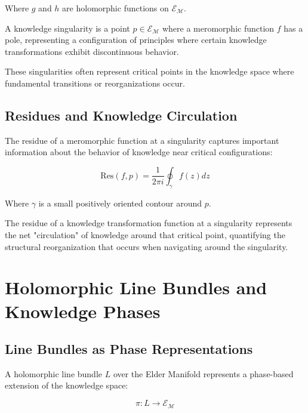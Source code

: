 Where $g$ and $h$ are holomorphic functions on $\mathcal{E}_{\mathcal{M}}$.

\begin{definition}
A knowledge singularity is a point $p \in \mathcal{E}_{\mathcal{M}}$ where a meromorphic function $f$ has a pole, representing a configuration of principles where certain knowledge transformations exhibit discontinuous behavior.
\end{definition}

These singularities often represent critical points in the knowledge space where fundamental transitions or reorganizations occur.

\subsection{Residues and Knowledge Circulation}

The residue of a meromorphic function at a singularity captures important information about the behavior of knowledge near critical configurations:

\begin{equation}
\text{Res}(f, p) = \frac{1}{2\pi i}\oint_{\gamma} f(z) dz
\end{equation}

Where $\gamma$ is a small positively oriented contour around $p$.

\begin{theorem}
The residue of a knowledge transformation function at a singularity represents the net "circulation" of knowledge around that critical point, quantifying the structural reorganization that occurs when navigating around the singularity.
\end{theorem}

\section{Holomorphic Line Bundles and Knowledge Phases}

\subsection{Line Bundles as Phase Representations}

A holomorphic line bundle $L$ over the Elder Manifold represents a phase-based extension of the knowledge space:

\begin{equation}
\pi: L \rightarrow \mathcal{E}_{\mathcal{M}}
\end{equation}

